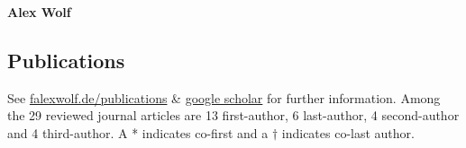 \documentclass[11pt]{scrartcl}
\def\newline{\\[.4em]}
\begin{document}
\thispagestyle{firstpage}
\pagestyle{fancy}
\vspace*{1em}
\begin{center}\textbf{\LARGE{Alex Wolf}}\end{center}


\setlength\LTleft{0em}
\subsection*{Publications}
See \href{https://falexwolf.de/publications}{falexwolf.de/publications} \& \href{http://scholar.google.de/citations?user=1FnOtMoAAAAJ\&hl=en}{google scholar} for further information. Among the 29 reviewed journal articles are 13 first-author, 6 last-author, 4 second-author and 4 third-author. A * indicates co-first and a $\dagger$ indicates co-last author.
\def\newline{\\[.6em]}


\newpage
\vspace{0em}

\end{document}

